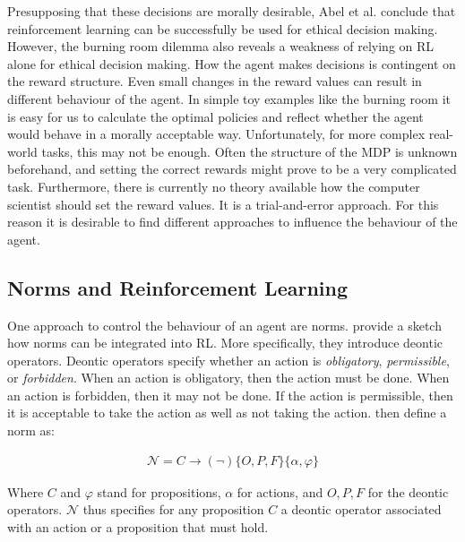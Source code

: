 Presupposing that these decisions are morally desirable, Abel et al. conclude that reinforcement learning can be successfully be used for ethical decision making. However, the burning room dilemma also reveals a weakness of relying on RL alone for ethical decision making. How the agent makes decisions is contingent on the reward structure. Even small changes in the reward values can result in different behaviour of the agent. In simple toy examples like the burning room it is easy for us to calculate the optimal policies and reflect whether the agent would behave in a morally acceptable way. Unfortunately, for more complex real-world tasks, this may not be enough. Often the structure of the MDP is unknown beforehand, and setting the correct rewards might prove to be a very complicated task. Furthermore, there is currently no theory available how the computer scientist should set the reward values. It is a trial-and-error approach. For this reason it is desirable to find different approaches to influence the behaviour of the agent.

\subsection{Norms and Reinforcement Learning}

One approach to control the behaviour of an agent are norms. \cite{arnold2017value} provide a sketch how norms can be integrated into RL. More specifically, they introduce deontic operators. Deontic operators specify whether an action is \emph{obligatory}, \emph{permissible}, or \emph{forbidden}. When an action is obligatory, then the action must be done. When an action is forbidden, then it may not be done. If the action is permissible, then it is acceptable to take the action as well as not taking the action. \cite{arnold2017value} then define a norm as:

\begin{align}
 	\mathcal{N} = C \rightarrow (\neg) \{O, P, F\} \{\alpha, \varphi \}
\end{align} 

Where $C$ and $\varphi$ stand for propositions, $\alpha$ for actions, and  $O, P, F$ for the deontic operators. $\mathcal{N}$ thus specifies for any proposition $C$ a deontic operator associated with an action or a proposition that must hold.


